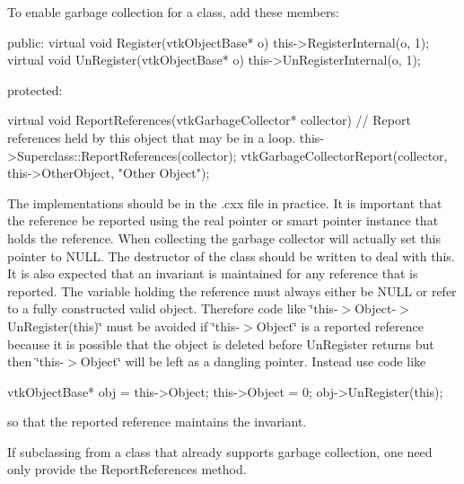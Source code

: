 To enable garbage collection for a class, add these members\-:

\begin{DoxyVerb}  public:
   virtual void Register(vtkObjectBase* o)
     {
     this->RegisterInternal(o, 1);
     }
   virtual void UnRegister(vtkObjectBase* o)
     {
     this->UnRegisterInternal(o, 1);
     }

  protected:

   virtual void ReportReferences(vtkGarbageCollector* collector)
     {
     // Report references held by this object that may be in a loop.
     this->Superclass::ReportReferences(collector);
     vtkGarbageCollectorReport(collector, this->OtherObject, "Other Object");
     }\end{DoxyVerb}


The implementations should be in the .cxx file in practice. It is important that the reference be reported using the real pointer or smart pointer instance that holds the reference. When collecting the garbage collector will actually set this pointer to N\-U\-L\-L. The destructor of the class should be written to deal with this. It is also expected that an invariant is maintained for any reference that is reported. The variable holding the reference must always either be N\-U\-L\-L or refer to a fully constructed valid object. Therefore code like \char`\"{}this-\/$>$\-Object-\/$>$\-Un\-Register(this)\char`\"{} must be avoided if \char`\"{}this-\/$>$\-Object\char`\"{} is a reported reference because it is possible that the object is deleted before Un\-Register returns but then \char`\"{}this-\/$>$\-Object\char`\"{} will be left as a dangling pointer. Instead use code like

\begin{DoxyVerb}   vtkObjectBase* obj = this->Object;
   this->Object = 0;
   obj->UnRegister(this);\end{DoxyVerb}


so that the reported reference maintains the invariant.

If subclassing from a class that already supports garbage collection, one need only provide the Report\-References method.

